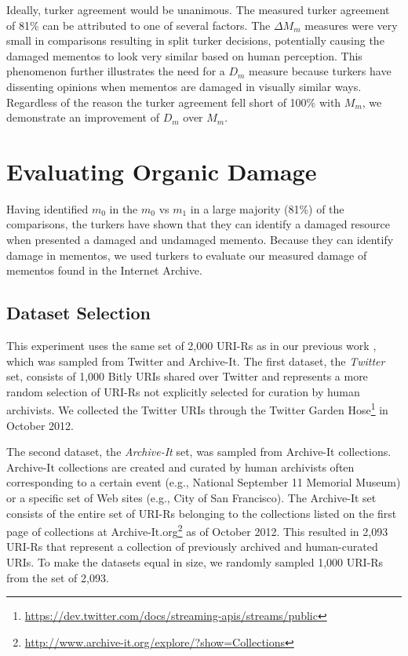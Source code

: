 Ideally, turker agreement would be unanimous. The measured turker agreement of 81\% can be attributed to one of several factors. The {$\Delta M_m$} measures were very small in comparisons resulting in split turker decisions, potentially causing the damaged mementos to look very similar based on human perception. This phenomenon further illustrates the need for a $D_m$ measure because turkers have dissenting opinions when mementos are damaged in visually similar ways. Regardless of the reason the turker agreement fell short of 100\% with $M_m$, we demonstrate an improvement of $D_m$ over $M_m$.

\section{Evaluating Organic Damage}
\label{turkActual}
Having identified $m_0$ in the $m_0$ vs $m_1$ in a large majority (81\%) of the comparisons, the turkers have shown that they can identify a damaged resource when presented a damaged and undamaged memento. Because they can identify damage in mementos, we used turkers to evaluate our measured damage of mementos found in the Internet Archive. 

\subsection{Dataset Selection}
\label{datasetSelection}

This experiment uses the same set of 2,000 URI-Rs as in our previous work \cite{ijdl}, which was sampled from Twitter and Archive-It. The first dataset, the \emph{Twitter} set, consists of 1,000 Bitly URIs shared over Twitter and represents a more random selection of URI-Rs not explicitly selected for curation by human archivists. We collected the Twitter URIs through the Twitter Garden Hose\footnote{\url{https://dev.twitter.com/docs/streaming-apis/streams/public}} in October 2012. 

The second dataset, the \emph{Archive-It} set, was sampled from Archive-It collections. Archive-It collections are created and curated by human archivists often corresponding to a certain event (e.g., National September 11 Memorial Museum) or a specific set of Web sites (e.g., City of San Francisco). The Archive-It set consists of the entire set of URI-Rs belonging to the collections listed on the first page of collections at Archive-It.org\footnote{\url{http://www.archive-it.org/explore/?show=Collections}} as of October 2012. This resulted in 2,093 URI-Rs that represent a collection of previously archived and human-curated URIs. To make the datasets equal in size, we randomly sampled 1,000 URI-Rs from the set of 2,093. 

